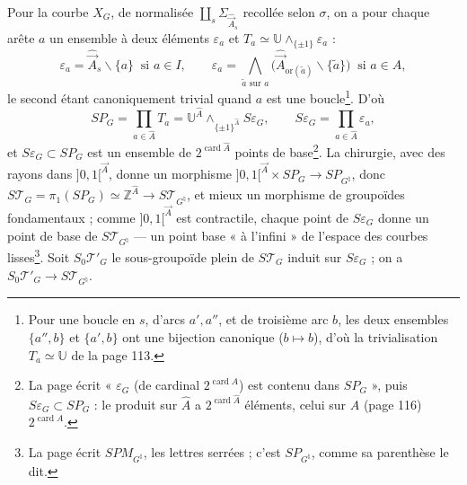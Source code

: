 \documentclass[11pt,a4paper]{article}
\begin{document}
Pour la courbe $X_G$, de normalisée $\coprod_s \Sigma_{\hat{\vec A}_s}$ recollée
selon $\sigma$, on a pour chaque arête $a$ un ensemble à deux éléments
$\varepsilon_a$ et $T_a \simeq \mathbb{U} \wedge_{\{\pm1\}} \varepsilon_a$ :
\[
\varepsilon_a = \hat{\vec A}_s \smallsetminus \{a\} \ \text{ si } a \in I, \qquad
\varepsilon_a = \bigwedge_{\tilde a \text{ sur } a} \bigl(\hat{\vec
A}_{\mathrm{or}(\tilde a)} \smallsetminus \{\tilde a\}\bigr) \ \text{ si } a \in A,
\]
le second étant canoniquement trivial quand $a$ est une boucle\footnote{Pour
une boucle en $s$, d'arcs $a', a''$, et de troisième arc $b$, les deux
ensembles $\{a'', b\}$ et $\{a', b\}$ ont une bijection canonique ($b \mapsto
b$), d'où la trivialisation $T_a \simeq \mathbb{U}$ de la page 113.}. D'où
\[
SP_G = \prod_{a \in \hat A} T_a = \mathbb{U}^{\hat A} \wedge_{\{\pm1\}^{\hat A}}
S\varepsilon_G, \qquad S\varepsilon_G = \prod_{a \in \hat A} \varepsilon_a ,
\]
et $S\varepsilon_G \subset SP_G$ est un ensemble de $2^{\operatorname{card}
\hat A}$ points de base\footnote{La page écrit « $\varepsilon_G$ (de cardinal
$2^{\operatorname{card} A}$) est contenu dans $SP_G$ », puis $S\varepsilon_G
\subset SP_G$ : le produit sur $\hat A$ a $2^{\operatorname{card} \hat A}$
éléments, celui sur $A$ (page 116) $2^{\operatorname{card} A}$.}. La
chirurgie, avec des rayons dans $]0,1[^{\vec A}$, donne un morphisme
$]0,1[^{\vec A} \times SP_G \to SP_{G^\natural}$, donc
$S\mathcal{T}_G = \pi_1(SP_G) \simeq \mathbb{Z}^{\hat A} \to
S\mathcal{T}_{G^\natural}$, et mieux un morphisme de groupoïdes fondamentaux ;
comme $]0,1[^{\vec A}$ est contractile, chaque point de $S\varepsilon_G$ donne
un point de base de $S\mathcal{T}_{G^\natural}$ — un point base « à l'infini »
de l'espace des courbes lisses\footnote{La page écrit $SPM_{G^\natural}$, les
lettres serrées ; c'est $SP_{G^\natural}$, comme sa parenthèse le dit.}. Soit
$S_0\mathcal{T}'_G$ le sous-groupoïde plein de $S\mathcal{T}_G$ induit sur
$S\varepsilon_G$ ; on a $S_0\mathcal{T}'_G \to S\mathcal{T}_{G^\natural}$.
\end{document}
